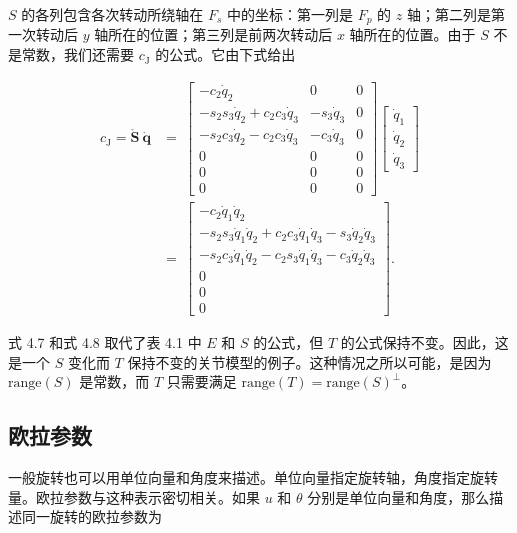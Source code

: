 \documentclass[10pt,a4paper]{book}
\theoremstyle{thmstyle} %
\theoremstyle{defstyle} %
\theoremstyle{prostyle} %
\begin{document}
$S$ 的各列包含各次转动所绕轴在 $F_s$ 中的坐标：第一列是 $F_p$ 的 $z$ 轴；第二列是第一次转动后 $y$ 轴所在的位置；第三列是前两次转动后 $x$ 轴所在的位置。由于 $S$ 不是常数，我们还需要 $c_{\mathrm{J}}$ 的公式。它由下式给出



$$
\begin{aligned}c_{\mathrm{J}}=\mathring{\boldsymbol{S}}\:\dot{\boldsymbol{q}}&=\:\begin{bmatrix}-c_2\dot{q}_2&0&0\\-s_2s_3\dot{q}_2+c_2c_3\dot{q}_3&-s_3\dot{q}_3&0\\-s_2c_3\dot{q}_2-c_2c_3\dot{q}_3&-c_3\dot{q}_3&0\\0&0&0\\0&0&0\\0&0&0\end{bmatrix}\begin{bmatrix}\dot{q}_1\\\dot{q}_2\\\dot{q}_3\end{bmatrix}\\&=\:\begin{bmatrix}-c_2\dot{q}_1\dot{q}_2\\-s_2s_3\dot{q}_1\dot{q}_2+c_2c_3\dot{q}_1\dot{q}_3-s_3\dot{q}_2\dot{q}_3\\-s_2c_3\dot{q}_1\dot{q}_2-c_2s_3\dot{q}_1\dot{q}_3-c_3\dot{q}_2\dot{q}_3\\0\\0\\0\end{bmatrix}.\end{aligned}
$$



式 4.7 和式 4.8 取代了表 4.1 中 $E$ 和 $S$ 的公式，但 $T$ 的公式保持不变。因此，这是一个 $S$ 变化而 $T$ 保持不变的关节模型的例子。这种情况之所以可能，是因为 $\text{range}(S)$ 是常数，而 $T$ 只需要满足 $\text{range}(T) = \text{range}(S)^\perp$。



\subsection{欧拉参数}





一般旋转也可以用单位向量和角度来描述。单位向量指定旋转轴，角度指定旋转量。欧拉参数与这种表示密切相关。如果 $u$ 和 $\theta$ 分别是单位向量和角度，那么描述同一旋转的欧拉参数为
\end{document}
